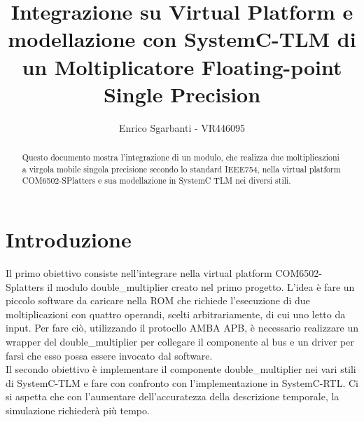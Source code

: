 \documentclass[]{IEEEtran}
\title{Integrazione su Virtual Platform e modellazione con SystemC-TLM di un Moltiplicatore Floating-point Single Precision}
\author{Enrico Sgarbanti - VR446095}
\begin{document}
\maketitle



\begin{abstract}
    Questo documento mostra l'integrazione di un modulo, che realizza due moltiplicazioni a virgola mobile singola precisione secondo lo standard IEEE754\cite{IEEE754}, nella virtual platform COM6502-SPlatters e sua modellazione in SystemC\cite{SystemC} TLM nei diversi stili.
\end{abstract}



\section{Introduzione}
Il primo obiettivo consiste nell'integrare nella virtual platform COM6502-Splatters il modulo double\_multiplier creato nel primo progetto. L'idea è fare un piccolo software da caricare nella ROM che richiede l'esecuzione di due moltiplicazioni con quattro operandi, scelti arbitrariamente, di cui uno letto da input. Per fare ciò, utilizzando il protocllo AMBA APB, è necessario realizzare un wrapper del double\_multiplier per collegare il componente al bus e un driver per farsì che esso possa essere invocato dal software.
\\Il secondo obiettivo è implementare il componente double\_multiplier nei vari stili di SystemC-TLM e fare con confronto con l'implementazione in SystemC-RTL. Ci si aspetta che con l'aumentare dell'accuratezza della descrizione temporale, la simulazione richiederà più tempo.
\end{document}
